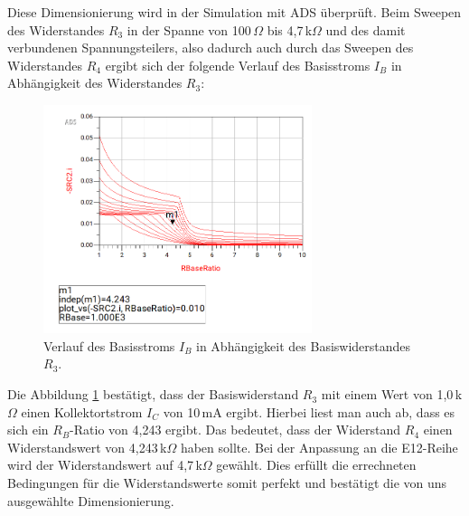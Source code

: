 Diese Dimensionierung wird in der Simulation mit \ac{ADS} überprüft. Beim Sweepen des Widerstandes $R_3$ in der Spanne von 100\,\(\Omega\) bis 4,7\,k\(\Omega\) und des damit verbundenen Spannungsteilers, also dadurch auch durch das Sweepen des Widerstandes $R_4$ ergibt sich der folgende Verlauf des Basisstroms $I_B$ in Abhängigkeit des Widerstandes $R_3$:
\begin{figure}[H] %
    \centering
    \includegraphics[width=0.7\textwidth]{Pictures/RBase.png}
    \caption{Verlauf des Basisstroms $I_B$ in Abhängigkeit des Basiswiderstandes $R_3$.}
    \label{fig:RBase}
\end{figure}
Die Abbildung \ref{fig:RBase} bestätigt, dass der Basiswiderstand $R_3$ mit einem Wert von 1{,}0\,k\(\Omega\) einen Kollektortstrom $I_C$ von 10\,mA ergibt. Hierbei liest man auch ab, dass es sich ein $R_B$-Ratio von 4,243 ergibt. 
Das bedeutet, dass der Widerstand $R_4$ einen Widerstandswert von 4{,}243\,k\(\Omega\) haben sollte. Bei der Anpassung an die E12-Reihe wird der Widerstandswert auf 4{,}7\,k\(\Omega\) gewählt. 
Dies erfüllt die errechneten Bedingungen für die Widerstandswerte somit perfekt und bestätigt die von uns ausgewählte Dimensionierung.

